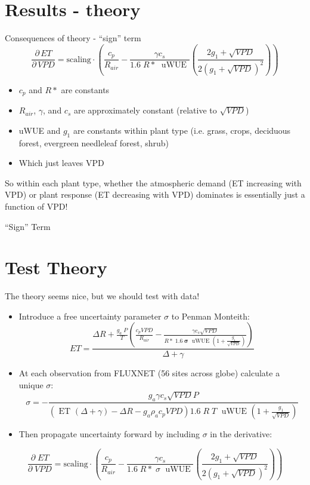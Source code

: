 \documentclass[aspectratio=169]{beamer}
\begin{document}
\section{Results - theory}
\begin{frame}{Consequences of theory - ``sign'' term}
  \[\frac{\partial \, ET}{\partial \, VPD} = \text{scaling} \cdot \left(\frac{ c_p}{R_{air}} - \frac{\gamma c_s }{1.6 \; R*\; \text{ uWUE }} \left( \frac{2 g_1 + \sqrt{VPD}}{2 (g_1 + \sqrt{VPD})^2}\right) \right)\]
  \begin{itemize}
  \item $c_p$ and $R*$ are constants
  \item $R_{air}$, $\gamma$, and $c_s$ are approximately constant (relative to $\sqrt{VPD}$)
  \item uWUE and $g_1$ are constants within plant type (i.e. grass, crops, deciduous forest, evergreen needleleaf forest, shrub)
  \item Which just leaves VPD
  \end{itemize}
  So within each plant type, whether the atmospheric demand (ET increasing with VPD) or plant response (ET decreasing with VPD) dominates is essentially just a function of VPD!
\end{frame}

\begin{frame}{``Sign'' Term}
  \begin{figure}
  \end{figure}
\end{frame}


\section{Test Theory}
\begin{frame}{The theory seems nice, but we should test with data!}
    \begin{itemize}
    \item Introduce a free uncertainty parameter $\sigma$ to Penman Monteith:
      \[ET = \frac{\Delta R + \frac{g_a\; P}{T} \left( \frac{ c_p VPD}{R_{air}} -  \frac{\gamma c_s \sqrt{VPD} }{ R* \; 1.6\; \boldsymbol{\sigma} \; \text{ uWUE } (1 + \frac{g_1}{\sqrt{VPD}})} \right) }{ \Delta + \gamma}\]
    \item At each observation from FLUXNET (56 sites across globe) calculate a unique $\sigma$:
      \small
      \[\sigma = - \frac{g_a \gamma c_s \sqrt{VPD} P }{ \left(\text{ ET } ( \Delta + \gamma) - \Delta R - g_a \rho_a c_p VPD\right) 1.6 \; R\; T\; \text{ uWUE } (1 + \frac{g_1}{\sqrt{VPD}})}\]
      \normalsize
    \item Then propagate uncertainty forward by including $\sigma$ in the derivative:
    \end{itemize}
      \[\frac{\partial \;  ET}{\partial \; VPD} = \text{scaling} \cdot \left(\frac{ c_p}{R_{air}} -  \frac{\gamma c_s }{1.6 \; R*\; \sigma \; \text{ uWUE }} \left( \frac{2 g_1 + \sqrt{VPD}}{2 (g_1 + \sqrt{VPD})^2}\right) \right)\]

  \end{frame}
  
\end{document}
